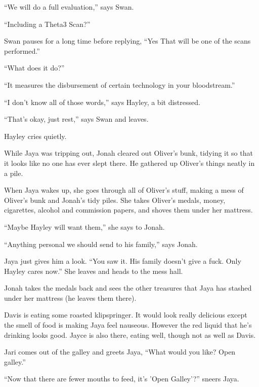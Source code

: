 ``We will do a full evaluation,'' says Swan.

``Including a Theta3 Scan?''

Swan pauses for a long time before replying, ``Yes  That will be one of the scans performed.''

``What does it do?''

``It measures the disbursement of certain technology in your bloodstream.''

``I don't know all of those words,'' says Hayley, a bit distressed.

``That's okay, just rest,'' says Swan and leaves.

Hayley cries quietly.





While Jaya was tripping out, Jonah cleared out Oliver's bunk, tidying it so that it looks like no one has ever slept there.  He gathered up Oliver's things neatly in a pile.



When Jaya wakes up, she goes through all of Oliver's stuff, making a mess of Oliver's bunk and Jonah's tidy piles.  She takes Oliver's medals, money, cigarettes, alcohol and commission papers, and shoves them under her mattress.

``Maybe Hayley will want them,'' she says to Jonah.

``Anything personal we should send to his family,'' says Jonah.

Jaya just gives him a look.  ``You saw it.  His family doesn't give a fuck.  Only Hayley cares now.''  She leaves and heads to the mess hall.



Jonah takes the medals back and sees the other treasures that Jaya has stashed under her mattress (he leaves them there).





Davis is eating some roasted klipspringer.  It would look really delicious except the smell of food is making Jaya feel nauseous.  However the red liquid that he's drinking looks good.  Jayce is also there, eating well, though not as well as Davis.



Jari comes out of the galley and greets Jaya, ``What would you like?  Open galley.''

``Now that there are fewer mouths to feed, it's 'Open Galley'?'' sneers Jaya.

